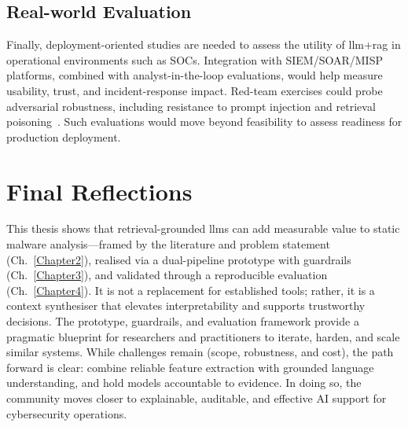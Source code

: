 \subsection{Real-world Evaluation}\label{sec:RealWorldEvaluation}
Finally, deployment-oriented studies are needed to assess the utility of \gls{llm}+\gls{rag} in
operational environments such as SOCs. Integration with SIEM/SOAR/MISP platforms, combined with
analyst-in-the-loop evaluations, would help measure usability, trust, and incident-response impact.
Red-team exercises could probe adversarial robustness, including resistance to prompt injection and
retrieval poisoning~\cite{zou2024poisonedrag}. Such evaluations would move beyond feasibility to
assess readiness for production deployment.

\section{Final Reflections}
This thesis shows that retrieval-grounded \glspl{llm} can add measurable value to static malware
analysis—framed by the literature and problem statement (Ch.~\ref{Chapter2}), realised via a
dual-pipeline prototype with guardrails (Ch.~\ref{Chapter3}), and validated through a reproducible
evaluation (Ch.~\ref{Chapter4}). It is not a replacement for established tools; rather, it is a
context synthesiser that elevates interpretability and supports trustworthy decisions. The
prototype, guardrails, and evaluation framework provide a pragmatic blueprint for researchers and
practitioners to iterate, harden, and scale similar systems. While challenges remain (scope,
robustness, and cost), the path forward is clear: combine reliable feature extraction with grounded
language understanding, and hold models accountable to evidence. In doing so, the community moves
closer to explainable, auditable, and effective AI support for cybersecurity operations.
